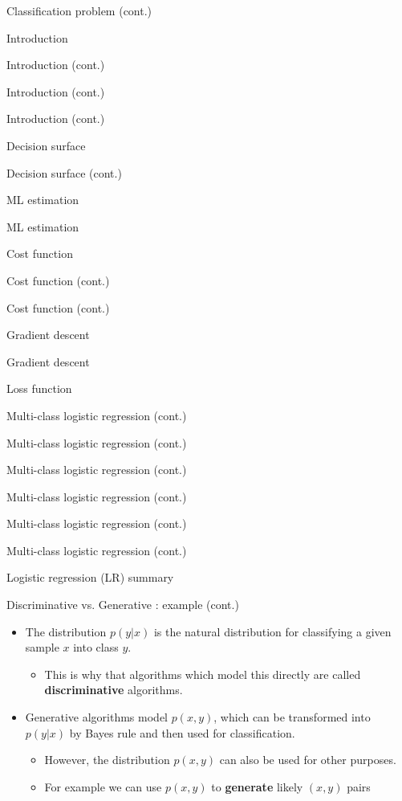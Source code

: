 \documentclass[serif, aspectratio=169]{beamer}
\begin{document}
\begin{frame}{Classification problem (cont.)}
\begin{itemize}
\begin{frame}{Introduction}
\begin{itemize}
\begin{frame}{Introduction (cont.)}
\begin{frame}{Introduction (cont.)}
\begin{frame}{Introduction (cont.)}
\begin{frame}{Decision surface}
\begin{itemize}
\begin{frame}{Decision surface (cont.)}
\begin{frame}{ML estimation}
\begin{frame}{ML estimation}
\begin{itemize}
\begin{frame}{Cost function}
\begin{frame}{Cost function (cont.)}
\begin{itemize}
\begin{itemize}
\begin{frame}{Cost function (cont.)}
\begin{frame}{Gradient descent}
\begin{frame}{Gradient descent}
\begin{frame}{Loss function}
\begin{frame}{Multi-class logistic regression (cont.)}
\begin{frame}{Multi-class logistic regression (cont.)}
\begin{frame}{Multi-class logistic regression (cont.)}
\begin{frame}{Multi-class logistic regression (cont.)}
\begin{frame}{Multi-class logistic regression (cont.)}
\begin{frame}{Multi-class logistic regression (cont.)}
\begin{frame}{Logistic regression (LR) summary}
\begin{itemize}
\begin{frame}{Discriminative vs. Generative : example (cont.)}
    \begin{itemize}
        \item The distribution $p(y|x)$ is the natural distribution for classifying a given sample $x$ into class $y$.
            \begin{itemize}
                \item This is why that algorithms which model this directly are called \textbf{discriminative} algorithms.
            \end{itemize}
        \item Generative algorithms model $p(x,y)$, which can be transformed into $p(y|x)$ by Bayes rule and then used for classification.
            \begin{itemize}
                \item However, the distribution $p(x,y)$ can also be used for other purposes.
                \item For example we can use $p(x,y)$ to \textbf{generate} likely $(x,y)$ pairs
            \end{itemize}
    \end{itemize}
\end{frame}


\end{itemize}
\end{frame}
\end{frame}
\end{frame}
\end{frame}
\end{frame}
\end{frame}
\end{frame}
\end{frame}
\end{frame}
\end{frame}
\end{frame}
\end{itemize}
\end{itemize}
\end{frame}
\end{frame}
\end{itemize}
\end{frame}
\end{frame}
\end{frame}
\end{itemize}
\end{frame}
\end{frame}
\end{frame}
\end{frame}
\end{itemize}
\end{frame}
\end{itemize}
\end{frame}
\end{document}
